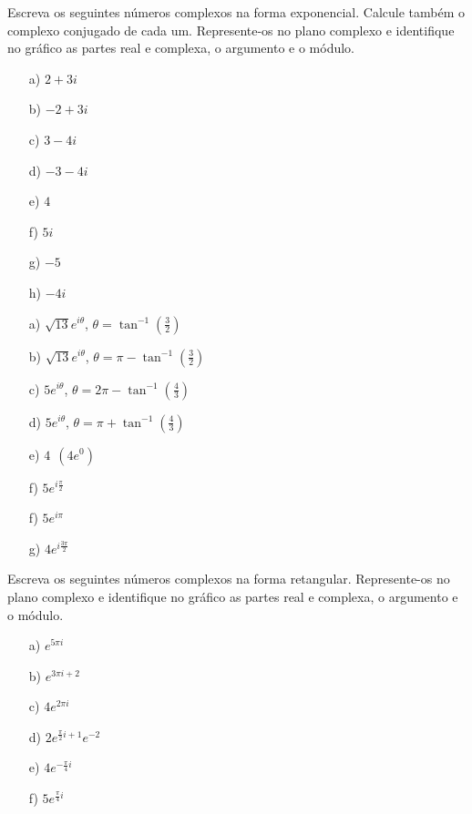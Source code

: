 \begin{exer}Escreva os seguintes números complexos na forma exponencial. Calcule também o complexo conjugado de cada um. Represente-os no plano complexo e identifique no gráfico as partes real e complexa, o argumento e o módulo.
\begin{itemize}
\item[a)] $2+3i$
\item[b)] $-2+3i$
\item[c)] $3-4i$
\item[d)] $-3-4i$
\item[e)] $4$
\item[f)] $5i$
\item[g)] $-5$
\item[h)] $-4i$
\end{itemize}
\end{exer}
\begin{resp}
\begin{itemize}
\item[a)] $\sqrt{13}e^{i\theta}$, $\theta=\tan^{-1}\left(\frac{3}{2}\right)$
\item[b)] $\sqrt{13}e^{i\theta}$, $\theta=\pi-\tan^{-1}\left(\frac{3}{2}\right)$
\item[c)] $5e^{i\theta}$, $\theta=2\pi-\tan^{-1}\left(\frac{4}{3}\right)$
\item[d)] $5e^{i\theta}$, $\theta=\pi+\tan^{-1}\left(\frac{4}{3}\right)$
\item[e)] $4~~\left(4e^{0}\right)$
\item[f)] $5e^{i\frac{\pi}{2}}$
\item[f)] $5e^{i\pi}$
\item[g)] $4e^{i\frac{3\pi}{2}}$
\end{itemize}
\end{resp}
\begin{exer}Escreva os seguintes números complexos na forma retangular. Represente-os no plano complexo e identifique no gráfico as partes real e complexa, o argumento e o módulo.
\begin{itemize}
\item[a)] $e^{5\pi i}$
\item[b)] $e^{3\pi i+2}$
\item[c)] $4e^{2\pi i}$
\item[d)] $2e^{\frac{\pi}{2}i+1}e^{-2}$
\item[e)] $4e^{-\frac{\pi}{4}i}$
\item[f)] $5e^{\frac{\pi}{4}i}$
\end{itemize}
\end{exer}
